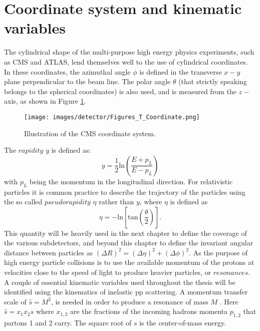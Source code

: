\section{Coordinate system and kinematic variables}\label{sec:kin}
\noindent\justify
The cylindrical shape of the multi-purpose high energy physics experiments, such as CMS and ATLAS, lend themselves well to the use of cylindrical coordinates. 
In these coordinates, the azimuthal angle $\phi$ is defined in the transverse $x-y$ plane perpendicular to the beam line. 
The polar angle $\theta$ (that strictly speaking belongs to the spherical coordinates) is also used, and is measured from the $z-$axis, as shown in Figure \ref{fig:cylindrical}.
\begin{figure}[!htp]
  \centering
   \texttt{[image: images/detector/Figures\_T\_Coordinate.png]}
   \caption{Illustration of the CMS coordinate system.\cite{Schott:2014sea}}
   \label{fig:cylindrical}
\end{figure}                                                                               
The $rapidity$ $y$ is defined as:
\begin{equation}
y=\frac{1}{2}\mathrm{ln}\left(\frac{E+p_{L}}{E-p_{L}}\right)
\label{eq:rapidity}
\end{equation}
with $p_{L}$ being the momentum in the longitudinal direction. 
For relativistic particles it is common practice to describe the trajectory of the particles using the so called $pseudorapidity$ $\eta$ rather than $y$, where $\eta$ is defined as
\begin{equation}
\eta=-\mathrm{ln}\left[\mathrm{tan}\left(\frac{\theta}{2}\right)\right].
\end{equation}
This quantity will be heavily used in the next chapter to define the coverage of the various subdetectors, and beyond this chapter to define the invariant angular distance between particles as $(\Delta R)^{2}=(\Delta \eta)^{2}+(\Delta \phi)^{2}$. 
As the purpose of high energy particle collisions is to use the available momentum of the protons at velocities close to the speed of light to produce heavier particles, or $resonances$. 
A couple of essential kinematic variables used throughout the thesis will be identified using the kinematics of inelastic pp scattering. 
A momentum transfer scale of $\hat{s}=M^{2}$, is needed in order to produce a resonance of mass $M$ \cite{Dissertori:2010xe}. 
Here $\hat{s}=x_{1}x_{2}s$ where $x_{1,2}$ are the fractions of the incoming hadrons momenta $p_{1,2}$ that partons 1 and 2 carry. 
The square root of $s$ is the center-of-mass energy. 
